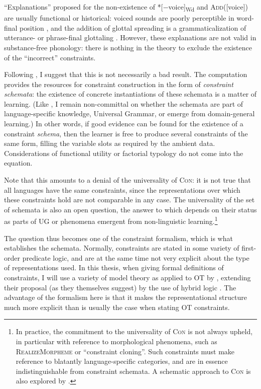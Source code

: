 \enquote{Explanations} proposed for the non\hyp existence of *[$-$voice]\textrbracket\textsubscript{Wd} and \textsc{Add}([voice]) are usually functional or historical: voiced sounds are poorly perceptible in word\hyp final position \citep[\egm][]{steriade97:_phonet}, and the addition of glottal spreading is a grammaticalization of utterance- or phrase\hyp final glottaling \citep{hock99:_final}. However, these explanations are not valid in substance\hyp free phonology: there is nothing in the theory to exclude the existence of the \enquote{incorrect} constraints.

Following \citet{pulleyblank06:_minim_ug,moren-foa}, I suggest that this is not necessarily a bad result. The computation provides the resources for constraint construction in the form of \emph{constraint schemata}: the existence of concrete instantiations of these schemata is a matter of learning. (Like \citealp{pulleyblank06:_minim_ug}, I remain non\hyp committal on whether the schemata are part of language\hyp specific knowledge, \ie Universal Grammar, or emerge from domain\hyp general learning.) In other words, if good evidence can be found for the existence of a constraint \emph{schema}, then the learner is free to produce several constraints of the same form, filling the variable slots as required by the ambient data. Considerations of functional utility or factorial typology do not come into the equation.

Note that this amounts to a denial of the universality of \textsc{Con}: it is not true that all languages have the same constraints, since the representations over which these constraints hold are not comparable in any case. The universality of the set of schemata is also an open question, the answer to which depends on their status as parts of UG or phenomena emergent from non\hyp linguistic learning.\footnote{In practice, the commitment to the universality of \textsc{Con} is not always upheld, in particular with reference to morphological phenomena, such as  \textsc{RealizeMorpheme} or  \enquote{constraint cloning}. Such constraints must make reference to blatantly language\hyp specific categories, and are in essence indistinguishable from constraint schemata. A schematic approach to \textsc{Con} is also explored by \citet{smith04:_makin}.}

The question thus becomes one of the constraint formalism, which is what establishes the schemata. Normally, constraints are stated in some variety of first\hyp order predicate logic, and are at the same time not very explicit about the type of representations used. In this thesis, when giving formal definitions of constraints, I will use a variety of model theory as applied to OT by \citep{potts02:_model_ot}, extending their proposal (as they themselves suggest) by the use of hybrid logic \citep{blackburn00:_repres,areces01:_bring,brauner08:_hybrid}. The advantage of the formalism here is that it makes the representational structure much more explicit than is usually the case when stating OT constraints.

